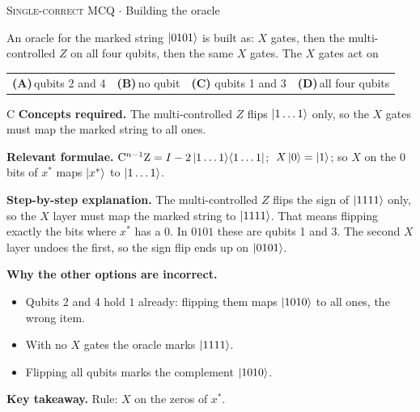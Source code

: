 \documentclass[11pt,a4paper]{article}
\newcommand{\optlabel}[1]{\textbf{(#1)}}
\newcommand{\correctlabel}[1]{\textcolor{okgreen}{\textbf{(#1)}\,\ding{51}}}
\newenvironment{qitem}[1]{\begin{list}{}{\setlength{\leftmargin}{3.3em}\setlength{\labelwidth}{3.1em}%
  \setlength{\labelsep}{0.2em}\setlength{\topsep}{3pt}\setlength{\parsep}{3pt}}\item[\textbf{Q.#1}\hfill]}{\end{list}}
\newcommand{\qsep}{\par\vspace{2pt}{\color{black!15}\hrule}\vspace{4pt}}
\newcommand{\qmeta}[2]{{\footnotesize\color{black!60}\textsc{#1} \;$\cdot$\; #2}\par}
\begin{document}
\begin{qitem}{45}
\qmeta{Single-correct MCQ}{Building the oracle}
An oracle for the marked string $\ket{0101}$ is built as: $X$ gates, then the multi-controlled $Z$ on all four qubits, then the same $X$ gates. The $X$ gates act on
\par\smallskip\noindent\begin{tabularx}{\linewidth}{@{}*{4}{L}@{}}
\optlabel{A}\,qubits 2 and 4 & \optlabel{B}\,no qubit & \correctlabel{C}\,qubits 1 and 3 & \optlabel{D}\,all four qubits
\end{tabularx}
\end{qitem}
\begin{solbox}{C}
\textbf{\color{brand}Concepts required.} The multi-controlled $Z$ flips $\ket{1\dots1}$ only, so the $X$ gates must map the marked string to all ones.

\textbf{\color{brand}Relevant formulae.} $\mathrm{C}^{n-1}\mathrm{Z} = I - 2\ket{1\dots1}\!\bra{1\dots1}$; $\;X\ket0 = \ket1$; so $X$ on the $0$ bits of $x^\ast$ maps $\ket{x^\ast}$ to $\ket{1\dots1}$.

\textbf{\color{brand}Step-by-step explanation.} The multi-controlled $Z$ flips the sign of $\ket{1111}$ only, so the $X$ layer must map the marked string to $\ket{1111}$. That means flipping exactly the bits where
$x^\ast$ has a $0$. In $0101$ these are qubits 1 and 3. The second $X$ layer undoes the first, so the sign flip ends up on $\ket{0101}$.

\textbf{\color{brand}Why the other options are incorrect.}
\begin{itemize}[leftmargin=2.4em, itemsep=1pt, topsep=2pt]
\item[\textbf{(A)}] Qubits 2 and 4 hold $1$ already: flipping them maps $\ket{1010}$ to all ones, the wrong item.
\item[\textbf{(B)}] With no $X$ gates the oracle marks $\ket{1111}$.
\item[\textbf{(D)}] Flipping all qubits marks the complement $\ket{1010}$.
\end{itemize}
\textbf{\color{brand}Key takeaway.} Rule: $X$ on the zeros of $x^\ast$.
\end{solbox}
\qsep
\end{document}
